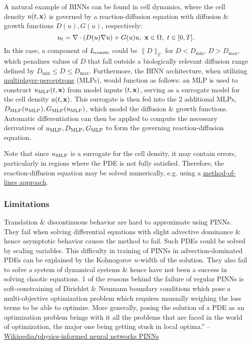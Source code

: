 \documentclass{article}
\begin{document}
A natural example of BINNs can be found in cell dynamics, where the cell density $u(t,{\bf x})$ is governed by a reaction-diffusion equation with diffusion \& growth functions $D(u),G(u)$, respectively:
\begin{equation*}
	u_t = \nabla\cdot(D(u)\nabla u) + G(u)u,\ {\bf x}\in\Omega,\ t\in[0,T].
\end{equation*}
In this case, a component of $L_{\rm constr}$ could be $\|D\|_\Gamma$ for $D < D_{\min}$, $D > D_{\max}$, which penalizes values of $D$ that fall outside a biologically relevant diffusion range defined by $D_{\min}\le D\le D_{\max}$. Furthermore, the BINN architecture, when utilizing \href{https://en.wikipedia.org/wiki/Multilayer_perceptron}{multiplayer-perceptrons} (MLPs), would function as follows: an MLP is used to construct $u_{\rm MLP}(t,{\bf x})$ from model inputs $(t,{\bf x})$, serving as a surrogate model for the cell density $u(t,{\bf x})$. This surrogate is then fed into the 2 additional MLPs, $D_{\rm MLP}(u_{\rm MLP}),G_{\rm MLP}(u_{\rm MLP})$, which model the diffusion \& growth functions. Automatic differentiation can then be applied to compute the necessary derivatives of $u_{\rm MLP},D_{\rm MLP},G_{\rm MLP}$ to form the governing reaction-diffusion equation.

Note that since $u_{\rm MLP}$ is a surrogate for the cell density, it may contain errors, particularly in regions where the PDE is not fully satisfied. Therefore, the reaction-diffusion equation may be solved numerically, e.g. using a \href{https://en.wikipedia.org/wiki/Method_of_lines}{method-of-lines approach}.

\subsubsection{Limitations}
Translation \& discontinuous behavior are hard to approximate using PINNs. They fail when solving differential equations with slight advective dominance \& hence asymptotic behavior causes the method to fail. Such PDEs could be solved by scaling variables. This difficulty in training of PINNs in advection-dominated PDEs can be explained by the Kolmogorov $n$-width of the solution. They also fail to solve a system of dynamical systems \& hence have not been a success in solving chaotic equations. 1 of the reasons behind the failure of regular PINNs is soft-constraining of Dirichlet \& Neumann boundary conditions which pose a multi-objective optimization problem which requires manually weighing the loss terms to be able to optimize. More generally, posing the solution of a PDE as an optimization problem brings with it all the problems that are faced in the world of optimization, the major one being getting stuck in local optima.'' -- \href{https://en.wikipedia.org/wiki/Physics-informed_neural_networks}{Wikipedia{\tt/}physics-informed neural networks PINNs}
\end{document}
